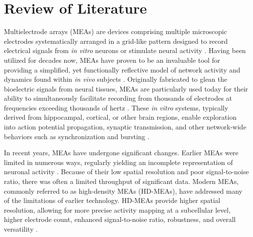 \documentclass{article} %
\begin{document}
\newpage

\setcounter{page}{1}

\section{Review of Literature}
Multielectrode arrays (MEAs) are devices comprising multiple microscopic electrodes systematically arranged in a grid-like pattern designed to record electrical signals from \textit{in vitro} neurons or stimulate neural activity \parencite{Wagenaar2006-td, Ahmadi_Seyedkhani2024-wl}. Having been utilized for decades now, MEAs have proven to be an invaluable tool for providing a simplified, yet functionally reflective model of network activity and dynamics found within \textit{in vivo} subjects \parencite{Obien2015-tg}. Originally fabricated to glean the bioelectric signals from neural tissues, MEAs are particularly used today for their ability to simultaneously facilitate recording from thousands of electrodes at frequencies exceeding thousands of hertz \parencite{Obien2015-tg, Frey2008-ou}. These \textit{in vitro} systems, typically derived from hippocampal, cortical, or other brain regions, enable exploration into action potential propagation, synaptic transmission, and other network-wide behaviors such as synchronization and bursting \parencite{Lee2020-es}.

In recent years, MEAs have undergone significant changes. Earlier MEAs were limited in numerous ways, regularly yielding an incomplete representation of neuronal activity \parencite{Muller2015-nz, Miccoli2019-hi}. Because of their low spatial resolution and poor signal-to-noise ratio, there was often a limited throughput of significant data. Modern MEAs, commonly referred to as high-density MEAs (HD-MEAs), have addressed many of the limitations of earlier technology. HD-MEAs provide higher spatial resolution, allowing for more precise activity mapping at a subcellular level, higher electrode count, enhanced signal-to-noise ratio, robustness, and overall versatility \parencite{Obien2015-tg, Obien2019-hs, Emmenegger2019-dk}.
\end{document}
